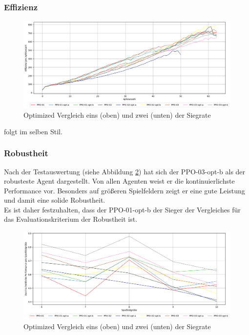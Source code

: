 \subsubsection{Effizienz}

\begin{figure}[H]
	\centering
	\includegraphics[scale=0.4517]{Abbildungen/Evaluation/optimized-effizienz.png}
	\caption[Optimized Vergleich Siegrate]{Optimized Vergleich eins (oben) und zwei (unten) der Siegrate}
	\label{fig:Optimized_Effizienz}
\end{figure}
folgt im selben Stil.

\subsubsection{Robustheit}
Nach der Testauswertung (siehe Abbildung \ref{fig:Optimized_Robustheit}) hat sich der PPO-03-opt-b als der robusteste Agent dargestellt. Von allen Agenten weist er die kontinuierlichste Performance vor. Besonders auf größeren Spielfeldern zeigt er eine gute Leistung und damit eine solide Robustheit.\\
Es ist daher festzuhalten, dass der PPO-01-opt-b der Sieger der Vergleiches für das Evaluationskriterium der Robustheit ist.
\begin{figure}[H]
	\centering
	\includegraphics[scale=0.4517]{Abbildungen/Evaluation/optimized-robustheit.png}
	\caption[Optimized Vergleich Siegrate]{Optimized Vergleich eins (oben) und zwei (unten) der Siegrate}
	\label{fig:Optimized_Robustheit}
\end{figure}

